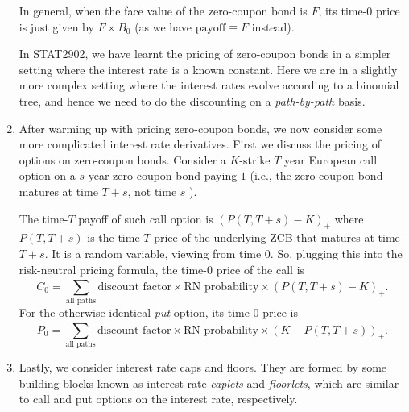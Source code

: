 \begin{enumerate}
\begin{note}
In general, when the face value of the zero-coupon bond is \(F\), its time-0
price is just given by \(F\times B_0\) (as we have \(\text{payoff}\equiv F\)
instead).
\end{note}

In STAT2902, we have learnt the pricing of zero-coupon bonds in a simpler
setting where the interest rate is a known constant. Here we are in a slightly
more complex setting where the interest rates evolve according to a binomial
tree, and hence we need to do the discounting on a \emph{path-by-path} basis.

\item \label{it:zcb-option-rn-pricing-fmla}
After warming up with pricing zero-coupon bonds, we now consider some
more complicated interest rate derivatives. First we discuss the pricing of
options on zero-coupon bonds. Consider a \(K\)-strike \(T\) year European call
option on a \(s\)-year zero-coupon bond paying \(1\) (i.e., the zero-coupon
bond matures at time \(T+s\), not time \(s\) \warn{}).

\begin{center}
\end{center}
The time-\(T\) payoff of such call option is \((P(T,T+s)-K)_{+}\) where
\(P(T,T+s)\) is the time-\(T\) price of the underlying ZCB that matures at time
\(T+s\). It is a random variable, viewing from time 0. So, plugging this into
the risk-neutral pricing formula, the time-0 price of the call is
\[
C_0=\boxed{\sum_{\text{all paths}}^{}\text{discount factor}\times \text{RN probability}\times (P(T,T+s)-K)_{+}}.
\]
For the otherwise identical \emph{put} option, its time-0 price is
\[
P_0=\boxed{\sum_{\text{all paths}}^{}\text{discount factor}\times \text{RN probability}\times (K-P(T,T+s))_{+}}.
\]
\item Lastly, we consider interest rate caps and floors. They are formed by
some building blocks known as interest rate \emph{caplets} and
\emph{floorlets}, which are similar to call and put options on the interest
rate, respectively.


\end{enumerate}
